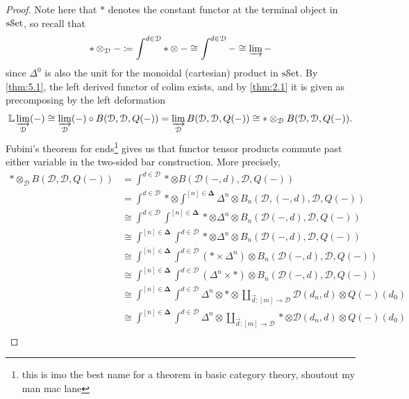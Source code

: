 \begin{proof}
	Note here that $*$ denotes the constant functor at the terminal object in $\mathrm{s}\mathcal{S}\mathrm{et}$, so recall that
	\[
		*\otimes _\mathcal{D} - \coloneqq \int^{d\in \mathcal{D} } *\otimes -\cong \int^{d\in \mathcal{D} } -\cong \varinjlim -
	\]
	since $\Delta^0$ is also the unit for the monoidal (cartesian) product in $\mathrm{s}\mathcal{S}\mathrm{et}$. By \cref{thm:5.1}, the left derived functor of colim exists, and by \cref{thm:2.1} it is given as precomposing by the left deformation
	\[
		\mathbb{L} \varinjlim _\mathcal{D} (-)\cong \varinjlim_\mathcal{D} (-)\circ B(\mathcal{D} ,\mathcal{D} ,Q(-))=\varinjlim _\mathcal{D} B(\mathcal{D} ,\mathcal{D} ,Q(-))\cong *\otimes _\mathcal{D} B(\mathcal{D} ,\mathcal{D} ,Q(-))
	.\]
	Fubini's theorem for ends\footnote{this is imo the best name for a theorem in basic category theory, shoutout my man mac lane} gives us that functor tensor products commute past either variable in the two-sided bar construction. More precisely,
	\begin{align*}
		*\otimes _\mathcal{D} B(\mathcal{D} ,\mathcal{D} ,Q(-))&=\int^{d\in \mathcal{D} } *\otimes B(\mathcal{D} (-,d),\mathcal{D} ,Q(-))\\
									   &=\int^{d\in \mathcal{D} } *\otimes \int^{[n]\in \boldsymbol{\Delta}} \Delta^n \otimes B_n(\mathcal{D} ,(-,d),\mathcal{D} ,Q(-))\\
									   &\cong\int^{d\in \mathcal{D} } \int^{[n]\in \boldsymbol{\Delta} } *\otimes \Delta^n \otimes B_n(\mathcal{D} (-,d),\mathcal{D} ,Q(-))\\
									   &\cong \int^{[n]\in \boldsymbol{\Delta} } \int^{d\in \mathcal{D} } *\otimes \Delta^n \otimes B_n(\mathcal{D} (-,d),\mathcal{D} ,Q(-))\\
									   &\cong \int^{[n]\in \boldsymbol{\Delta} } \int^{d\in \mathcal{D} } (*\times \Delta^n)\otimes B_n(\mathcal{D} (-,d),\mathcal{D} ,Q(-))\\
									   &\cong \int^{[n]\in\boldsymbol{\Delta} } \int^{d\in \mathcal{D} } (\Delta^n\times *)\otimes B_n(\mathcal{D} (-,d),\mathcal{D} ,Q(-))\\
									   &\cong \int^{[n]\in \boldsymbol{\Delta} } \int^{d\in \mathcal{D} } \Delta^n \otimes *\otimes \coprod_{\vec{d} : [m] \to \mathcal{D} } \mathcal{D} (d_n,d)\otimes Q(-)(d_0)\\
									   &\cong \int^{[n]\in\boldsymbol{\Delta} } \int^{d\in \mathcal{D} } \Delta^n \otimes \coprod_{\vec{d} : [m] \to \mathcal{D} } *\otimes \mathcal{D} (d_n,d)\otimes Q(-)(d_0)\\

\end{align*}
\end{proof}
